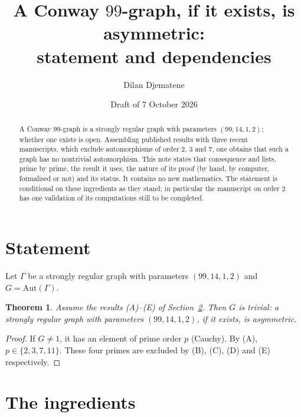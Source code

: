 \documentclass[11pt]{amsart}
\title[A Conway 99-graph is asymmetric]{A Conway $99$-graph, if it exists, is asymmetric:\\ statement and dependencies}
\author{Dilan Djematene}
\date{Draft of 7 October 2026}
\newtheorem{theorem}{Theorem}
\theoremstyle{remark}
\newcommand{\G}{\Gamma}
\begin{document}
\begin{abstract}
A Conway $99$-graph is a strongly regular graph with parameters $(99,14,1,2)$; whether one exists is open. Assembling
published results with three recent manuscripts, which exclude automorphisms of order $2$, $3$ and $7$, one obtains that
such a graph has no nontrivial automorphism. This note states that consequence and lists, prime by prime, the result it
uses, the nature of its proof (by hand, by computer, formalised or not) and its status. It contains no new mathematics. The statement is conditional on these ingredients as they stand; in particular the
manuscript on order $2$ has one validation of its computations still to be completed.
\end{abstract}

\maketitle

\section{Statement}

Let $\G$ be a strongly regular graph with parameters $(99,14,1,2)$ and $G=\mathrm{Aut}(\G)$.

\begin{theorem}\label{thm:asym}
Assume the results \textup{(A)}--\textup{(E)} of Section~\ref{sec:ing}. Then $G$ is trivial: a strongly regular graph with
parameters $(99,14,1,2)$, if it exists, is asymmetric.
\end{theorem}

\begin{proof}
If $G\neq1$, it has an element of prime order $p$ (Cauchy). By (A), $p\in\{2,3,7,11\}$. These four primes are excluded by
(B), (C), (D) and (E) respectively.
\end{proof}

\section{The ingredients}\label{sec:ing}
\end{document}
